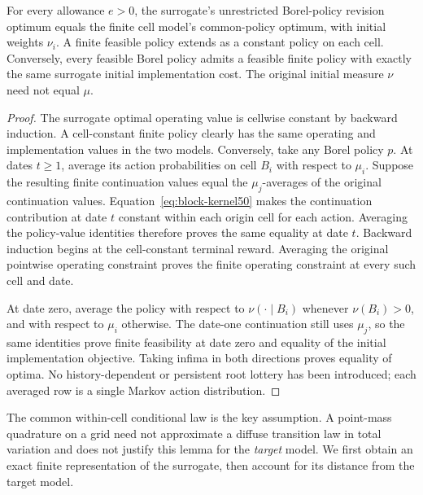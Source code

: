 \begin{lemma}\label{lem:averaging50}
For every allowance $e>0$, the surrogate's unrestricted Borel-policy revision optimum equals the finite cell model's common-policy optimum, with initial weights $\nu_i$. A finite feasible policy extends as a constant policy on each cell. Conversely, every feasible Borel policy admits a feasible finite policy with exactly the same surrogate initial implementation cost. The original initial measure $\nu$ need not equal $\mu$.
\end{lemma}
\begin{proof}
The surrogate optimal operating value is cellwise constant by backward induction. A cell-constant finite policy clearly has the same operating and implementation values in the two models. Conversely, take any Borel policy $p$. At dates $t\ge1$, average its action probabilities on cell $B_i$ with respect to $\mu_i$. Suppose the resulting finite continuation values equal the $\mu_j$-averages of the original continuation values. Equation~\eqref{eq:block-kernel50} makes the continuation contribution at date $t$ constant within each origin cell for each action. Averaging the policy-value identities therefore proves the same equality at date $t$. Backward induction begins at the cell-constant terminal reward. Averaging the original pointwise operating constraint proves the finite operating constraint at every such cell and date.

At date zero, average the policy with respect to $\nu(\cdot\mid B_i)$ whenever $\nu(B_i)>0$, and with respect to $\mu_i$ otherwise. The date-one continuation still uses $\mu_j$, so the same identities prove finite feasibility at date zero and equality of the initial implementation objective. Taking infima in both directions proves equality of optima. No history-dependent or persistent root lottery has been introduced; each averaged row is a single Markov action distribution.\end{proof}

The common within-cell conditional law is the key assumption. A point-mass quadrature on a grid need not approximate a diffuse transition law in total variation and does not justify this lemma for the \emph{target} model. We first obtain an exact finite representation of the surrogate, then account for its distance from the target model.

